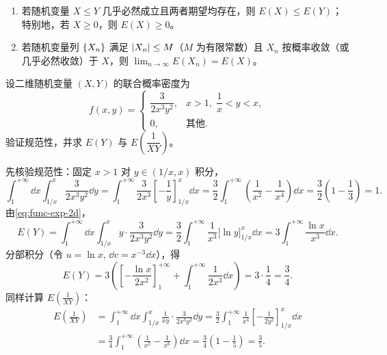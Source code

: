 \begin{lemma}[期望的单调性与有界收敛性质]
\label{lem:expectation-limits}
\begin{enumerate}
  \item 若随机变量 $X\le Y$ 几乎必然成立且两者期望均存在，则 $E(X)\le E(Y)$；特别地，若 $X\ge 0$，则 $E(X)\ge 0$。
  \item 若随机变量列 $\{X_n\}$ 满足 $\lvert X_n\rvert\le M$（$M$ 为有限常数）且 $X_n$ 按概率收敛（或几乎必然收敛）于 $X$，则 $\lim_{n\to\infty}E(X_n)=E(X)$。
\end{enumerate}
\end{lemma}

\begin{example}[title={无界曲边支集上的二维函数期望}]
\label{eg:unbounded-function-expectation}
设二维随机变量 $(X,Y)$ 的联合概率密度为
\[
  f(x,y)=
  \begin{cases}
    \dfrac{3}{2x^3 y^2},& x>1,\;\dfrac{1}{x}<y<x,\\
    0,& \text{其他}.
  \end{cases}
\]
验证规范性，并求 $E(Y)$ 与 $E\!\left(\dfrac{1}{XY}\right)$。
\begin{solution}
先核验规范性：固定 $x>1$ 对 $y\in(1/x,x)$ 积分，
\[
  \int_{1}^{+\infty}\dd x\int_{1/x}^{x}\frac{3}{2x^3 y^2}\dd y
  =\int_{1}^{+\infty}\frac{3}{2x^3}\left[-\frac{1}{y}\right]_{1/x}^{x}\dd x
  =\frac{3}{2}\int_{1}^{+\infty}\left(\frac{1}{x^2}-\frac{1}{x^4}\right)\dd x
  =\frac{3}{2}\left(1-\frac{1}{3}\right)=1.
\]
由\eqref{eq:func-exp-2d}，
\[
  E(Y)=\int_{1}^{+\infty}\dd x\int_{1/x}^{x}y\cdot\frac{3}{2x^3 y^2}\dd y
  =\frac{3}{2}\int_{1}^{+\infty}\frac{1}{x^3}\bigl[\ln y\bigr]_{1/x}^{x}\dd x
  =3\int_{1}^{+\infty}\frac{\ln x}{x^3}\dd x.
\]
分部积分（令 $u=\ln x,\,\dd v=x^{-3}\dd x$），得
\[
  E(Y)=3\left(\left[-\frac{\ln x}{2x^2}\right]_{1}^{+\infty}+\int_{1}^{+\infty}\frac{1}{2x^3}\dd x\right)
  =3\cdot\frac{1}{4}=\frac{3}{4}.
\]
同样计算 $E\!\left(\frac{1}{XY}\right)$：
\[
\begin{aligned}
  E\!\left(\frac{1}{XY}\right)
  &=\int_{1}^{+\infty}\dd x\int_{1/x}^{x}\frac{1}{xy}\cdot\frac{3}{2x^3 y^2}\dd y
  =\frac{3}{2}\int_{1}^{+\infty}\frac{1}{x^4}\left[-\frac{1}{2y^2}\right]_{1/x}^{x}\dd x\\
  &=\frac{3}{4}\int_{1}^{+\infty}\left(\frac{1}{x^2}-\frac{1}{x^6}\right)\dd x
  =\frac{3}{4}\left(1-\frac{1}{5}\right)=\frac{3}{5}.
\end{aligned}
\]
\end{solution}
\end{example}


